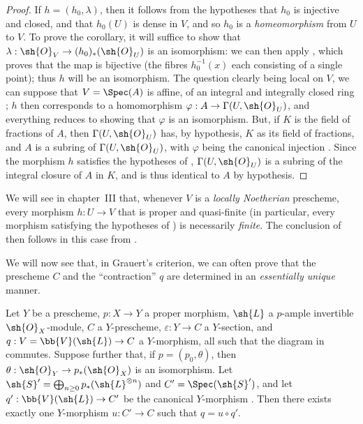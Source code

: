 \begin{proof}
\label{proof-II.8.11.2}
If $h=(h_0,\lambda)$, then it follows from the hypotheses that $h_0$ is injective and closed, and that $h_0(U)$
is dense in $V$, and so $h_0$ is a \emph{homeomorphism} from $U$ to $V$.
To prove the corollary, it will suffice to show that $\lambda:\sh{O}_V\to(h_0)_*(\sh{O}_U)$ is an isomorphism: we can then apply , which proves that the map  is bijective (the fibres $h_0^{-1}(x)$ each consisting of a single point);
thus $h$ will be an isomorphism.
The question clearly being local on $V$, we can suppose that $V=\Spec(A)$ is affine, of an integral and integrally closed ring ;
$h$ then corresponds  to a homomorphism $\varphi:A\to\Gamma(U,\sh{O}_U)$, and everything reduces to showing that $\varphi$ is an isomorphism.
But, if $K$ is the field of fractions of $A$, then $\Gamma(U,\sh{O}_U)$ has, by hypothesis, $K$ as its field of fractions, and $A$ is a subring of $\Gamma(U,\sh{O}_U)$, with $\varphi$ being the canonical injection .
Since the morphism $h$ satisfies the hypotheses of , $\Gamma(U,\sh{O}_U)$ is a subring of the integral closure of $A$ in $K$, and is thus identical to $A$ by hypothesis.
\end{proof}

\begin{remark}[8.11.3]
\label{II.8.11.3}
We will see in chapter~III  that, whenever $V$ is a \emph{locally Noetherian} prescheme, every morphism $h:U\to V$ that is proper and quasi-finite (in particular, every morphism satisfying the hypotheses of ) is necessarily \emph{finite}.
The conclusion of  then follows in this case from .
\end{remark}

\begin{env}[8.11.4]
\label{II.8.11.4}
We will now see that, in Grauert's criterion, we can often prove that the prescheme $C$ and the ``contraction'' $q$ are determined in an \emph{essentially unique} manner.
\end{env}

\begin{lemma}[8.11.5]
\label{II.8.11.5}
Let $Y$ be a prescheme, $p:X\to Y$ a proper morphism, $\sh{L}$ a $p$-ample invertible $\sh{O}_X$-module, $C$ a $Y$-prescheme, $\varepsilon:Y\to C$ a $Y$-section, and $q:V=\bb{V}(\sh{L})\to C$ a $Y$-morphism, all such that the diagram in  commutes.
Suppose further that, if $p=(p_0,\theta)$, then $\theta:\sh{O}_Y\to p_*(\sh{O}_X)$ is an isomorphism.
Let $\sh{S}'=\bigoplus_{n\geq0}p_*(\sh{L}^{\otimes n})$ and $C'=\Spec(\sh{S}')$, and let $q':\bb{V}(\sh{L})\to C'$ be the canonical $Y$-morphism .
Then there exists exactly one $Y$-morphism $u:C'\to C$ such that $q=u\circ q'$.
\end{lemma}

